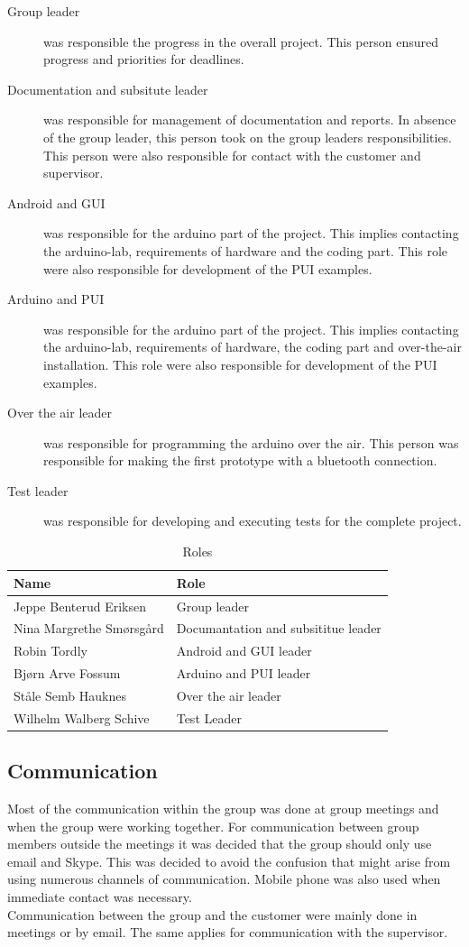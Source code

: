 \begin{description}
	\item[Group leader]{was responsible the progress in the overall project. This person ensured progress and priorities for deadlines.}
	\item[Documentation and subsitute leader]{was responsible for management of documentation and reports. In absence of the group leader, this person took on the group leaders responsibilities. This person were also responsible for contact with the customer and supervisor.}
	\item[Android and GUI]{was responsible for the arduino part of the project. This implies contacting the arduino-lab, requirements of hardware and the coding part. This role were also responsible for development of the PUI examples.}
	\item[Arduino and PUI]{was responsible for the arduino part of the project. This implies contacting the arduino-lab, requirements of hardware, the coding part and over-the-air installation. This role were also responsible for development of the PUI examples.}
	\item[Over the air leader]{was responsible for programming the arduino over the air. This person was responsible for making the first prototype with a bluetooth connection.}
	\item[Test leader]{was responsible for developing and executing tests for the complete project.}
\end{description}

\begin{table}
\begin{tabular}{|l|l|}
\hline
	{\bf Name} & {\bf Role}\\
\hline
	Jeppe Benterud Eriksen & Group leader\\
\hline
	Nina Margrethe Smørsgård & Documantation and subsititue leader\\
\hline
	Robin Tordly & Android and GUI leader\\
\hline
	Bjørn Arve Fossum & Arduino and PUI leader\\
\hline
	Ståle Semb Hauknes & Over the air leader\\
\hline
	Wilhelm Walberg Schive & Test Leader\\
\hline
\end{tabular}
\caption{Roles}
\end{table}

\subsection{Communication}
Most of the communication within the group was done at group meetings and when the group were working together. For communication between group members outside the meetings it was decided that the group should only use email and Skype. This was decided to avoid the confusion that might arise from using numerous channels of communication. Mobile phone was also used when immediate contact was necessary.\\
\newline
Communication between the group and the customer were mainly done in meetings or by email. The same applies for communication with the supervisor.

